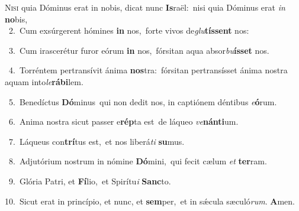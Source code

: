 \lettrine{\initial\textcolor{\initialcolor}{N}}{isi} quia Dóminus erat in nobis, dicat nunc \textbf{Is}\-raël:~\star nisi quia Dóminus erat \textit{in} \textbf{no}\-bis,\\
{\numbfont\textcolor{\numbcolor}{~2.}}~Cum exsúrgerent hómines \textbf{in} nos,~\star forte vivos de\-\textit{glu}\-\textbf{tís}\textbf{sent} nos:\par
{\numbfont\textcolor{\numbcolor}{~3.}}~Cum irascerétur furor eórum \textbf{in} nos,~\star fórsitan aqua absor\-\textit{bu}\-\textbf{ís}\textbf{set} nos.\par
{\numbfont\textcolor{\numbcolor}{~4.}}~Torréntem pertransívit ánima \textbf{nos}\-tra:~\star fórsitan pertransísset ánima nostra aquam into\-\textit{le}\-\textbf{rá}\textbf{bi}lem.\par
{\numbfont\textcolor{\numbcolor}{~5.}}~Benedíctus \textbf{Dó}\-minus~\star qui non dedit nos, in captiónem déntibus \textit{e}\-\textbf{ó}rum.\par
{\numbfont\textcolor{\numbcolor}{~6.}}~Anima nostra sicut passer e\-\textbf{rép}\-ta est~\star de láqueo \textit{ve}\-\textbf{nán}\textbf{ti}um.\par
{\numbfont\textcolor{\numbcolor}{~7.}}~Láqueus con\-\textbf{trí}\-tus est,~\star et nos liberá\textit{ti} \textbf{su}\-mus.\par
{\numbfont\textcolor{\numbcolor}{~8.}}~Adjutórium nostrum in nómine \textbf{Dó}\-mini,~\star qui fecit cælum \textit{et} \textbf{ter}\-ram.\par
{\numbfont\textcolor{\numbcolor}{~9.}}~Glória Patri, et \textbf{Fí}\-lio,~\star et Spirítu\textit{i} \textbf{Sanc}\-to.\par
{\numbfont\textcolor{\numbcolor}{10.}}~Sicut erat in princípio, et nunc, et \textbf{sem}\-per,~\star et in sǽcula sæculó\-\textit{rum}\-. \textbf{A}\-men.\par
